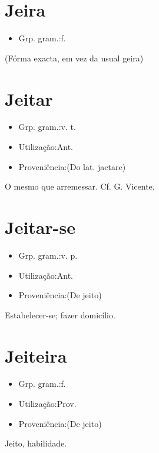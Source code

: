 \documentclass{article}
\begin{document}
\section{Jeira}
\begin{itemize}
\item {Grp. gram.:f.}
\end{itemize}
(Fórma exacta, em vez da usual \textunderscore geira\textunderscore )
\section{Jeitar}
\begin{itemize}
\item {Grp. gram.:v. t.}
\end{itemize}
\begin{itemize}
\item {Utilização:Ant.}
\end{itemize}
\begin{itemize}
\item {Proveniência:(Do lat. \textunderscore jactare\textunderscore )}
\end{itemize}
O mesmo que \textunderscore arremessar\textunderscore . Cf. G. Vicente.
\section{Jeitar-se}
\begin{itemize}
\item {Grp. gram.:v. p.}
\end{itemize}
\begin{itemize}
\item {Utilização:Ant.}
\end{itemize}
\begin{itemize}
\item {Proveniência:(De \textunderscore jeito\textunderscore )}
\end{itemize}
Estabelecer-se; fazer domicílio.
\section{Jeiteira}
\begin{itemize}
\item {Grp. gram.:f.}
\end{itemize}
\begin{itemize}
\item {Utilização:Prov.}
\end{itemize}
\begin{itemize}
\item {Proveniência:(De \textunderscore jeito\textunderscore )}
\end{itemize}
Jeito, habilidade.
\end{document}
